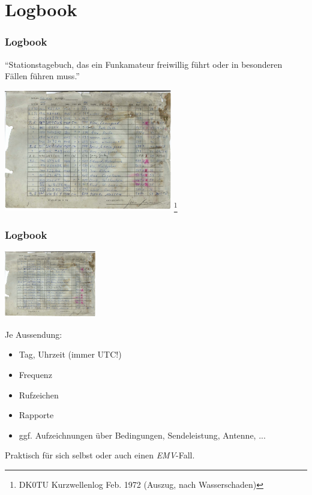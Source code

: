 \section{Logbook}

\begin{frame}
    \frametitle{Logbook}

    ``Stationstagebuch, das ein Funkamateur freiwillig führt oder in besonderen
    Fällen führen muss.''

    \begin{center}
        \includegraphics[width=0.55\textwidth]{bv13/DK0TU_LOG_KW_1972-02_Auszug.jpg}
        \tiny \footnote{DK0TU Kurzwellenlog Feb. 1972 (Auszug, nach Wasserschaden)}
    \end{center}

\end{frame}

\begin{frame}
    \frametitle{Logbook}

    \begin{center}
        \includegraphics[width=0.3\textwidth]{bv13/DK0TU_LOG_KW_1972-02_Auszug.jpg}
    \end{center}

    Je Aussendung:
    
    \begin{itemize}
        \item Tag, Uhrzeit (immer UTC!)
        \item Frequenz
        \item Rufzeichen
        \item Rapporte
        \item ggf. Aufzeichnungen über Bedingungen, Sendeleistung, Antenne, ...
    \end{itemize}

    Praktisch für sich selbst oder auch einen \emph{EMV}-Fall.

\end{frame}

